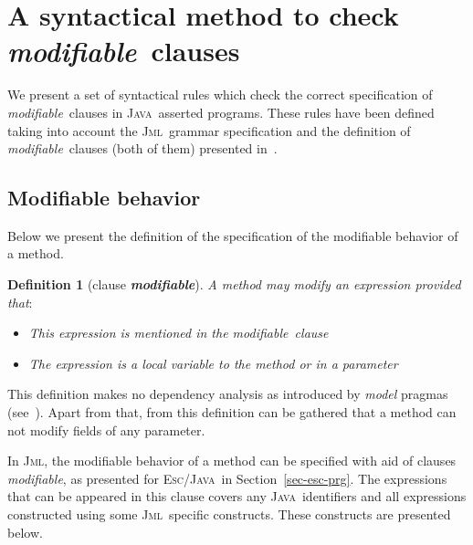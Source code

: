 \documentclass[a4paper]{llncs}
\newcommand{\jml}{\textsc{Jml}}
\newcommand{\escj}{\textsc{Esc/Java}}
\newcommand{\java}{\textsc{Java}}
\newcommand{\modif}{\textit{modifiable}}
\newtheorem {df}{Definition}
\begin{document}
\section{A syntactical method to check \modif~clauses}
\label{sec-giv-sin-def}
We present a set of syntactical rules which check the correct
specification of \modif~clauses in \java~asserted programs. These
rules have been defined taking into account the \jml~grammar
specification and the definition of \modif~clauses (both of them)
presented in~\cite{LBR00}.




\subsection{Modifiable behavior}
Below we present the definition of the specification of the modifiable
behavior of a method.
\begin{df}[clause {\bf \it modifiable}]
\label{def-mod}
A method may modify an expression provided that$:$ 
\begin{itemize}
\item This expression is mentioned in the \modif~clause
\item The expression is a local variable to the method or in a
parameter
\end{itemize}
\end{df}
This definition makes no dependency analysis as introduced by
\emph{model} pragmas (see~\cite{LBR00}). Apart from that, from this
definition can be
gathered that a method can not modify fields of any parameter.

In \jml, the modifiable behavior of a method can be specified with
aid of clauses \modif, as presented for \escj~in
Section~\ref{sec-esc-prg}. The expressions that can be appeared in this
clause covers any
\java~identifiers and all expressions constructed using some
\jml~specific constructs. These constructs are presented below.
\end{document}
